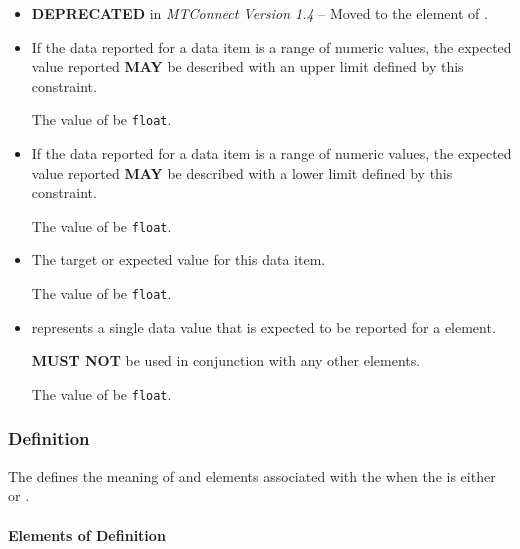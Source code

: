 \begin{itemize}

\item {} \newline \textbf{DEPRECATED} in \textit{MTConnect Version 1.4} – Moved to the
 element of .

\item {} \newline If the data reported for a data item is a range of numeric values, the expected value reported \textbf{MAY} be described with an upper limit defined by this constraint.

The value of  \MUST be \texttt{float}.

\item {} \newline If the data reported for a data item is a range of numeric values, the expected value reported \textbf{MAY} be described with a lower limit defined by this constraint.

The value of  \MUST be \texttt{float}.

\item {} \newline The target or expected value for this data item.

The value of  \MUST be \texttt{float}.

\item {} \newline {} represents a single data value that is expected to be reported for a  element.

 \textbf{MUST NOT} be used in conjunction with any other  elements.

The value of  \MUST be \texttt{float}.
\end{itemize}

\subsubsection{Definition}
\label{sec:Definition}



The  defines the meaning of  and  elements associated with the  when the  is either  or .


\paragraph{Elements of Definition}\mbox{}
\label{sec:Elements of Definition}

